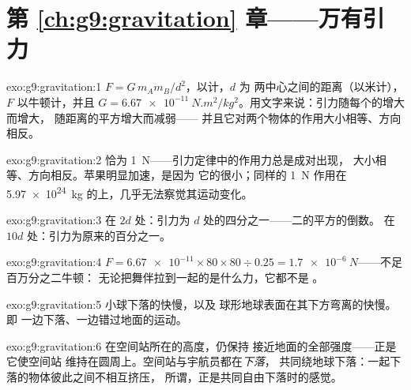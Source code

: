 \section*{第 \ref{ch:g9:gravitation} 章——万有引力}

\begin{solution}{exo:g9:gravitation:1}
$F = G \, m_A m_B / d^2$，以计，$d$ 为
两中心之间的距离（以米计），$F$ 以牛顿计，并且
$G = \qty{6.67e-11}{N.m^2/kg^2}$。用文字来说：引力随每个的增大而增大，
随距离的平方增大而减弱——
并且它对两个物体的作用大小相等、方向相反。
\end{solution}

\begin{solution}{exo:g9:gravitation:2}
恰为 \qty{1}{N}——引力定律中的作用力总是成对出现，
大小相等、方向相反。苹果明显加速，是因为
它的很小；同样的 \qty{1}{N} 作用在
\qty{5.97e24}{kg} 的上，几乎无法察觉其运动变化。
\end{solution}

\begin{solution}{exo:g9:gravitation:3}
在 $2d$ 处：引力为 $d$ 处的四分之一——二的平方的倒数。
在 $10d$ 处：引力为原来的百分之一。
\end{solution}

\begin{solution}{exo:g9:gravitation:4}
$F = \num{6.67e-11} \times 80 \times 80 \div 0.25 =
\qty{1.7e-6}{N}$——不足百万分之二牛顿：
无论把舞伴拉到一起的是什么力，它都不是
。
\end{solution}

\begin{solution}{exo:g9:gravitation:5}
小球下落的快慢，以及
球形地球表面在其下方弯离的快慢。即
一边下落、一边错过地面的运动。
\end{solution}

\begin{solution}{exo:g9:gravitation:6}
在空间站所在的高度，仍保持
接近地面的全部强度——正是它使空间站
维持在圆周上。空间站与宇航员都在\emph{下落}，
共同绕地球下落：一起下落的物体彼此之间不相互挤压，
所谓，正是共同自由下落时的感觉。
\end{solution}


